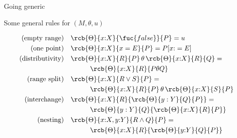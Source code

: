 \documentclass{beamer}
\def\false{\fuc{false}}
\def\e{\mathbin{\wedge}}
\def\ou{\mathbin{\vee}}
\begin{document}
\begin{slide}{Going generic}

\begin{block}{Some general rules for $(M,\theta,u)$}

\begin{align*}
\text{(empty range)} && & \rcb{\Theta}{x{:}X}{\false}{P} = u\\
\text{(one point)} && & \rcb{\Theta}{x{:}X}{x =E}{P} = P[x{:}=E] \\
\text{(distributivity)} && & \rcb{\Theta}{x{:}X}{R}{P} \, \theta\,  \rcb{\Theta}{x{:}X}{R}{Q} = \\ &&& \hspace{1cm} \rcb{\Theta}{x{:}X}{R}{P \theta Q}\\
\text{(range split)} && & \rcb{\Theta}{x{:}X}{R \ou S}{P} = \\ &&& \hspace{1cm}\rcb{\Theta}{x{:}X}{R}{P} \, \theta\, \rcb{\Theta}{x{:}X}{S}{P} \\
\text{(interchange)} && & \rcb{\Theta}{x{:}X}{R}{\rcb{\Theta}{y:Y}{Q}{P}} = \\ &&& \hspace{1cm}  \rcb{\Theta}{y:Y}{Q}{\rcb{\Theta}{x{:}X}{R}{P}}\\
\text{(nesting)} && & \rcb{\Theta}{x{:}X, y{:}Y}{R \e Q}{P} = \\ &&& \hspace{1cm}  \rcb{\Theta}{x{:}X}{R}{\rcb{\Theta}{y{:}Y}{Q}{P}} 
\end{align*}
\end{block}
\end{slide}
\end{document}
